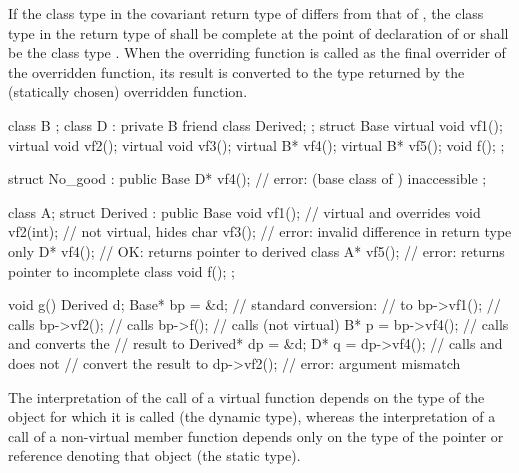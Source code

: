 \pnum
If the class type in the covariant return type of  differs from that of
, the class type in the return type of  shall be
complete at the point of declaration of  or shall be the
class type . When the overriding function is called as the
final overrider of the overridden function, its result is converted to
the type returned by the (statically chosen) overridden
function.
\begin{example}
\begin{codeblock}
class B { };
class D : private B { friend class Derived; };
struct Base {
  virtual void vf1();
  virtual void vf2();
  virtual void vf3();
  virtual B*   vf4();
  virtual B*   vf5();
  void f();
};

struct No_good : public Base {
  D*  vf4();        // error:  (base class of ) inaccessible
};

class A;
struct Derived : public Base {
    void vf1();     // virtual and overrides 
    void vf2(int);  // not virtual, hides 
    char vf3();     // error: invalid difference in return type only
    D*   vf4();     // OK: returns pointer to derived class
    A*   vf5();     // error: returns pointer to incomplete class
    void f();
};

void g() {
  Derived d;
  Base* bp = &d;                // standard conversion:
                                //  to 
  bp->vf1();                    // calls 
  bp->vf2();                    // calls 
  bp->f();                      // calls  (not virtual)
  B*  p = bp->vf4();            // calls  and converts the
                                // result to 
  Derived*  dp = &d;
  D*  q = dp->vf4();            // calls  and does not
                                // convert the result to 
  dp->vf2();                    // error: argument mismatch
}
\end{codeblock}
\end{example}

\pnum
\begin{note}
The interpretation of the call of a virtual function depends on the type
of the object for which it is called (the dynamic type), whereas the
interpretation of a call of a non-virtual member function depends only
on the type of the pointer or reference denoting that object (the static
type).
\end{note}

